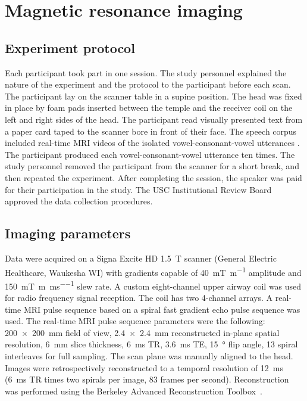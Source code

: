 \documentclass[preprint]{JASAnew}
\begin{document}
\section{Magnetic resonance imaging}
\label{sec:mri}

\subsection{Experiment protocol}

Each participant took part in one session. The study personnel explained the nature of the experiment and the protocol to the participant before each scan. The participant lay on the scanner table in a supine position. The head was fixed in place by foam pads inserted between the temple and the receiver coil on the left and right sides of the head. The participant read visually presented text from a paper card taped to the scanner bore in front of their face. The speech corpus included real-time MRI videos of the isolated vowel-consonant-vowel utterances \textipa{[apa], [ata], [aka], [aja]}. The participant produced each vowel-consonant-vowel utterance ten times. The study personnel removed the participant from the scanner for a short break, and then repeated the experiment. After completing the session, the speaker was paid for their participation in the study. The USC Institutional Review Board approved the data collection procedures. 




\subsection{Imaging parameters}

Data were acquired on a Signa Excite HD \SI{1.5}{\tesla} scanner (General Electric Healthcare, Waukesha WI) with gradients capable of \SI[per-mode=symbol]{40}{\milli\tesla\per\meter} amplitude and \SI[per-mode=repeated-symbol]{150}{\milli\tesla\per\meter\per\milli\second} slew rate. A custom eight-channel upper airway coil was used for radio frequency signal reception. The coil has two 4-channel arrays. 
%
A real-time MRI pulse sequence based on a spiral fast gradient echo pulse sequence was used. 
%
The real-time MRI pulse sequence parameters were the following: 
%
\SI{200 x 200}{\milli\meter} field of view, 
\SI{2.4 x 2.4}{\milli\meter} reconstructed in-plane spatial resolution, 
\SI{6}{\milli\meter} slice thickness,
\SI{6}{\milli\second} TR,
\SI{3.6}{\milli\second} TE,
\SI{15}{\degree} flip angle,
\num{13} spiral interleaves for full sampling.
%
The scan plane was manually aligned to the head. 
%
Images were retrospectively reconstructed to a temporal resolution of \SI{12}{\milli\second} (\SI{6}{\milli\second} TR times two spirals per image, 83 frames per second). 
%
Reconstruction was performed using the Berkeley Advanced Reconstruction Toolbox~\citep{uecker2015berkeley}.
\end{document}
